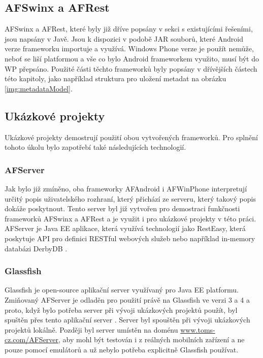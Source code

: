 \subsection{AFSwinx a AFRest}
AFSwinx a AFRest, které byly již dříve popsány v sekci s existujícími řešeními, jsou napsány v Javě. Jsou k dispozici v podobě JAR souborů, které Android verze frameworku importuje a využívá. Windows Phone verze je použít nemůže, neboť se liší platformou a vše co bylo Android frameworkem využito, musí být do WP přepsáno.
Použité části těchto frameworků byly popsány v dřívějších částech této kapitoly, jako například struktura pro uložení metadat na obrázku \ref{img:metadataModel}.

\subsection{Ukázkové projekty}  
Ukázkové projekty demostrují použití obou vytvořených frameworků. Pro splnění tohoto úkolu bylo zapotřebí také následujících technologií.
\subsubsection{AFServer}
Jak bylo již zmíněno, oba frameworky AFAndroid i AFWinPhone interpretují určitý popis uživatelského rozhraní, který přichází ze serveru, který takový popis dokáže poskytnout. Tento server byl již vytvořen pro demostraci funkčnosti frameworků AFSwinx a AFRest a je využit i pro ukázkové projekty v této práci. AFServer je Java EE aplikace, která využívá technologií jako RestEasy, která poskytuje API pro definici RESTful webových služeb nebo například in-memory databázi DerbyDB \cite{tomasek-thesis}. 
\subsubsection{Glassfish}
Glassfish \cite{glassfish} je open-source aplikační server využívaný pro Java EE platformu. Zmiňovaný AFServer je odladěn pro použití právě na Glassfish ve verzi 3 a 4 a proto, když bylo potřeba server při vývoji ukázkových projektů použít, byl spuštěn přes tento aplikační server \cite{tomasek-thesis}. Server byl spouštěn při vývoji ukázkových projektů lokálně. Později byl server umístěn na doménu \url{www.toms-cz.com/AFServer}, aby mohl být testován i z reálných mobilních zařízení a ne pouze pomocí emulátorů a už nebylo potřeba explicitně Glassfish používat.

